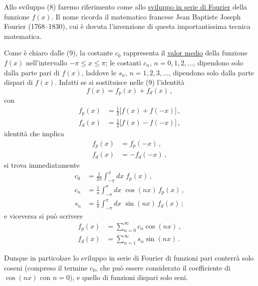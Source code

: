 \documentclass[11pt, a4paper]{book}
\numberwithin{equation}{section}
\begin{document}
Allo sviluppo (8) faremo riferimento come allo \underline{sviluppo in serie di Fourier} della funzione $f(x)$. Il nome ricorda il matematico francese Jean Baptiste Joseph Fourier (1768--1830), cui è dovuta l'invenzione di questa importantissima tecnica matematica.

Come è chiaro dalle (9), la costante $c_0$ rappresenta il \underline{valor medio} della funzione $f(x)$ nell'intervallo $-\pi \leq x \leq \pi$; le costanti $c_n$, $n=0,1,2,\ldots$, dipendono solo dalla parte pari di $f(x)$, laddove le $s_n$, $n=1,2,3,\ldots$, dipendono solo dalla parte dispari di $f(x)$. Infatti se si sostituisce nelle (9) l'identità
\begin{equation}
  f(x) = f_p(x) + f_d(x)\,, \tag{10}
\end{equation}
con
\begin{align}
  f_p(x) &= \tfrac{1}{2}\bigl[f(x)+f(-x)\bigr]\,, \tag{11a}\\
  f_d(x) &= \tfrac{1}{2}\bigl[f(x)-f(-x)\bigr]\,, \tag{11b}
\end{align}
identità che implica
\begin{align}
  f_p(x) &= f_p(-x)\,, \tag{12a}\\
  f_d(x) &= -f_d(-x)\,, \tag{12b}
\end{align}
si trova immediatamente
\begin{align}
  c_0 &= \frac{1}{2\pi}\int_{-\pi}^{\pi} dx\;f_p(x)\,, \tag{13a}\\
  c_n &= \frac{1}{\pi}\int_{-\pi}^{\pi} dx\;\cos(nx)\,f_p(x)\,, \tag{13b}\\
  s_n &= \frac{1}{\pi}\int_{-\pi}^{\pi} dx\;\sin(nx)\,f_d(x)\,; \tag{13c}
\end{align}
e viceversa si può scrivere
\begin{align}
  f_p(x) &= \sum_{n=0}^{\infty} c_n\cos(nx)\,, \tag{14a}\\
  f_d(x) &= \sum_{n=1}^{\infty} s_n\sin(nx)\,. \tag{14b}
\end{align}

Dunque in particolare lo sviluppo in serie di Fourier di funzioni pari conterrà solo coseni (compreso il termine $c_0$, che può essere considerato il coefficiente di $\cos(nx)$ con $n=0$), e quello di funzioni dispari solo seni.
\end{document}
